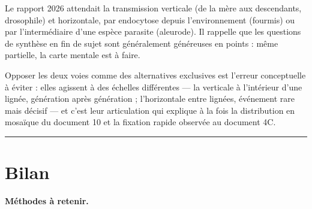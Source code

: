 \documentclass[11pt,a4paper]{article}
\begin{document}
\begin{jury}

Le rapport 2026 attendait la transmission verticale (de la mère aux descendants, drosophile) et horizontale, par endocytose depuis l'environnement (fourmis) ou par l'intermédiaire d'une espèce parasite (aleurode). Il rappelle que les questions de synthèse en fin de sujet sont généralement généreuses en points : même partielle, la carte mentale est à faire.

\end{jury}

\begin{piege}

Opposer les deux voies comme des alternatives exclusives est l'erreur conceptuelle à éviter : elles agissent à des échelles différentes --- la verticale à l'intérieur d'une lignée, génération après génération ; l'horizontale entre lignées, événement rare mais décisif --- et c'est leur articulation qui explique à la fois la distribution en mosaïque du document 10 et la fixation rapide observée au document 4C.

\end{piege}

\begin{center}\rule{0.5\linewidth}{0.5pt}\end{center}

\hypertarget{bilan}{%
\section{Bilan}\label{bilan}}

\textbf{Méthodes à retenir.}
\end{document}
